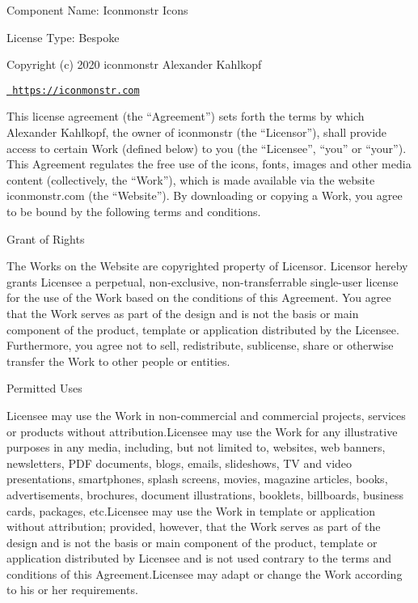  Component Name\+: Iconmonstr Icons

License Type\+: Bespoke

Copyright (c) 2020 iconmonstr Alexander Kahlkopf

\href{https://iconmonstr.com}{\texttt{ https\+://iconmonstr.\+com}}

This license agreement (the “\+Agreement”) sets forth the terms by which Alexander Kahlkopf, the owner of iconmonstr (the “\+Licensor”), shall provide access to certain Work (defined below) to you (the “\+Licensee”, “you” or “your”). This Agreement regulates the free use of the icons, fonts, images and other media content (collectively, the “\+Work”), which is made available via the website iconmonstr.\+com (the “\+Website”). By downloading or copying a Work, you agree to be bound by the following terms and conditions.


\begin{DoxyEnumerate}
\item Grant of Rights
\end{DoxyEnumerate}

The Works on the Website are copyrighted property of Licensor. Licensor hereby grants Licensee a perpetual, non-\/exclusive, non-\/transferrable single-\/user license for the use of the Work based on the conditions of this Agreement. You agree that the Work serves as part of the design and is not the basis or main component of the product, template or application distributed by the Licensee. Furthermore, you agree not to sell, redistribute, sublicense, share or otherwise transfer the Work to other people or entities.


\begin{DoxyEnumerate}
\item Permitted Uses
\end{DoxyEnumerate}

Licensee may use the Work in non-\/commercial and commercial projects, services or products without attribution.\+Licensee may use the Work for any illustrative purposes in any media, including, but not limited to, websites, web banners, newsletters, PDF documents, blogs, emails, slideshows, TV and video presentations, smartphones, splash screens, movies, magazine articles, books, advertisements, brochures, document illustrations, booklets, billboards, business cards, packages, etc.\+Licensee may use the Work in template or application without attribution; provided, however, that the Work serves as part of the design and is not the basis or main component of the product, template or application distributed by Licensee and is not used contrary to the terms and conditions of this Agreement.\+Licensee may adapt or change the Work according to his or her requirements.


